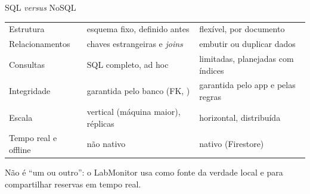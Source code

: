 \documentclass[aspectratio=169,10pt]{beamer}
\begin{document}
\begin{frame}{SQL \emph{versus} NoSQL}
  \footnotesize
  \begin{tabularx}{\textwidth}{@{}l L L@{}}
    \toprule
    &  &  \\
    \midrule
    Estrutura & esquema fixo, definido antes & flexível, por documento \\
    Relacionamentos & chaves estrangeiras e \emph{joins} & embutir ou duplicar dados \\
    Consultas & SQL completo, ad hoc & limitadas, planejadas com índices \\
    Integridade & garantida pelo banco (FK, ) & garantida pelo app e pelas regras \\
    Escala & vertical (máquina maior), réplicas & horizontal, distribuída \\
    Tempo real e offline & não nativo & nativo (Firestore) \\
    \bottomrule
  \end{tabularx}
  \vspace{4pt}
  \begin{caixaambar}
    Não é ``um ou outro'': o LabMonitor usa  como fonte da verdade local e  para compartilhar reservas em tempo real.
  \end{caixaambar}
\end{frame}
\end{document}
